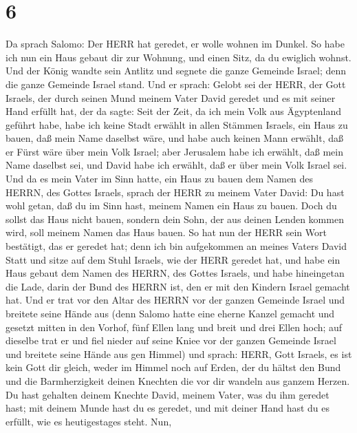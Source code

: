 \hypertarget{section-5}{%
\section{6}\label{section-5}}

 Da sprach Salomo: Der HERR hat geredet, er wolle wohnen im
Dunkel.  So habe ich nun ein Haus gebaut dir zur Wohnung,
und einen Sitz, da du ewiglich wohnst.  Und der König wandte
sein Antlitz und segnete die ganze Gemeinde Israel; denn die ganze
Gemeinde Israel stand.  Und er sprach: Gelobt sei der HERR,
der Gott Israels, der durch seinen Mund meinem Vater David geredet und
es mit seiner Hand erfüllt hat, der da sagte:  Seit der
Zeit, da ich mein Volk aus Ägyptenland geführt habe, habe ich keine
Stadt erwählt in allen Stämmen Israels, ein Haus zu bauen, daß mein Name
daselbst wäre, und habe auch keinen Mann erwählt, daß er Fürst wäre über
mein Volk Israel;  aber Jerusalem habe ich erwählt, daß mein
Name daselbst sei, und David habe ich erwählt, daß er über mein Volk
Israel sei.  Und da es mein Vater im Sinn hatte, ein Haus zu
bauen dem Namen des HERRN, des Gottes Israels,  sprach der
HERR zu meinem Vater David: Du hast wohl getan, daß du im Sinn hast,
meinem Namen ein Haus zu bauen.  Doch du sollst das Haus
nicht bauen, sondern dein Sohn, der aus deinen Lenden kommen wird, soll
meinem Namen das Haus bauen.  So hat nun der HERR sein Wort
bestätigt, das er geredet hat; denn ich bin aufgekommen an meines Vaters
David Statt und sitze auf dem Stuhl Israels, wie der HERR geredet hat,
und habe ein Haus gebaut dem Namen des HERRN, des Gottes Israels,
 und habe hineingetan die Lade, darin der Bund des HERRN
ist, den er mit den Kindern Israel gemacht hat.  Und er
trat vor den Altar des HERRN vor der ganzen Gemeinde Israel und breitete
seine Hände aus  (denn Salomo hatte eine eherne Kanzel
gemacht und gesetzt mitten in den Vorhof, fünf Ellen lang und breit und
drei Ellen hoch; auf dieselbe trat er und fiel nieder auf seine Kniee
vor der ganzen Gemeinde Israel und breitete seine Hände aus gen Himmel)
 und sprach: HERR, Gott Israels, es ist kein Gott dir
gleich, weder im Himmel noch auf Erden, der du hältst den Bund und die
Barmherzigkeit deinen Knechten die vor dir wandeln aus ganzem Herzen.
 Du hast gehalten deinem Knechte David, meinem Vater, was
du ihm geredet hast; mit deinem Munde hast du es geredet, und mit deiner
Hand hast du es erfüllt, wie es heutigestages steht.  Nun,
